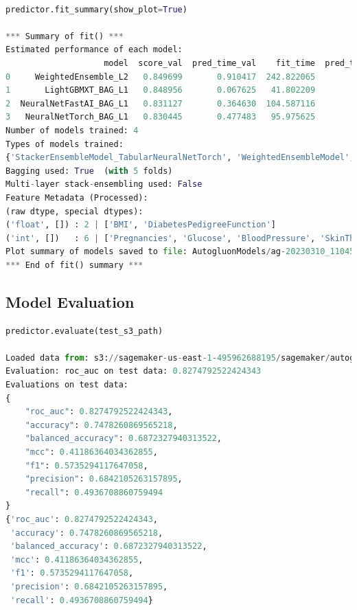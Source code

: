 \documentclass[
]{article}
\begin{document}
\begin{lstlisting}[language=python]

predictor.fit_summary(show_plot=True)

*** Summary of fit() ***
Estimated performance of each model:
                    model  score_val  pred_time_val    fit_time  pred_time_val_marginal  fit_time_marginal  stack_level  can_infer  fit_order
0     WeightedEnsemble_L2   0.849699       0.910417  242.822065                0.000679           0.457114            2       True          4
1       LightGBMXT_BAG_L1   0.848956       0.067625   41.802209                0.067625          41.802209            1       True          1
2  NeuralNetFastAI_BAG_L1   0.831127       0.364630  104.587116                0.364630         104.587116            1       True          2
3   NeuralNetTorch_BAG_L1   0.830445       0.477483   95.975625                0.477483          95.975625            1       True          3
Number of models trained: 4
Types of models trained:
{'StackerEnsembleModel_TabularNeuralNetTorch', 'WeightedEnsembleModel', 'StackerEnsembleModel_NNFastAiTabular', 'StackerEnsembleModel_LGB'}
Bagging used: True  (with 5 folds)
Multi-layer stack-ensembling used: False 
Feature Metadata (Processed):
(raw dtype, special dtypes):
('float', []) : 2 | ['BMI', 'DiabetesPedigreeFunction']
('int', [])   : 6 | ['Pregnancies', 'Glucose', 'BloodPressure', 'SkinThickness', 'Insulin', ...]
Plot summary of models saved to file: AutogluonModels/ag-20230310_110459/SummaryOfModels.html
*** End of fit() summary ***

\end{lstlisting}

\hypertarget{model-evaluation}{%
\subsection{Model Evaluation}\label{model-evaluation}}

\begin{lstlisting}[language=python]
predictor.evaluate(test_s3_path)

Loaded data from: s3://sagemaker-us-east-1-495962688195/sagemaker/autogluon-tabular/data/test.csv | Columns = 9 / 9 | Rows = 230 -> 230
Evaluation: roc_auc on test data: 0.8274792522424343
Evaluations on test data:
{
    "roc_auc": 0.8274792522424343,
    "accuracy": 0.7478260869565218,
    "balanced_accuracy": 0.6872327940313522,
    "mcc": 0.41186364034362855,
    "f1": 0.5735294117647058,
    "precision": 0.6842105263157895,
    "recall": 0.4936708860759494
}
{'roc_auc': 0.8274792522424343,
 'accuracy': 0.7478260869565218,
 'balanced_accuracy': 0.6872327940313522,
 'mcc': 0.41186364034362855,
 'f1': 0.5735294117647058,
 'precision': 0.6842105263157895,
 'recall': 0.4936708860759494}
\end{lstlisting}
\end{document}
